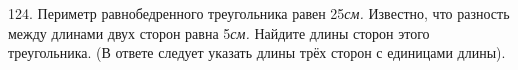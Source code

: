124. Периметр равнобедренного треугольника равен 25{\it см.} Известно, что разность между длинами двух сторон равна 5{\it см.} Найдите длины сторон этого треугольника. (В ответе следует указать длины трёх сторон с единицами длины).\\
